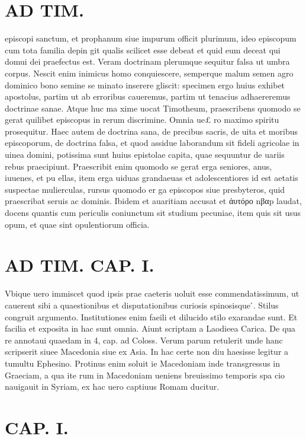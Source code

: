 \documentclass{article}
\begin{document}
\begin{pages}
\section*{AD TIM. }
\marginpar{[ p.93 ]}\pstart episcopi sanctum, et prophanum siue impurum officit plurimum, ideo episcopum cum tota familia depin git qualis scilicet esse debeat et quid eum deceat qui domui dei praefectus est.  \pend\pstart Veram doctrinam plerumque sequitur falsa ut umbra corpus. Nescit enim inimicus homo conquiescere, semperque malum semen agro dominico bono semine se minato inserere gliscit: specimen ergo huius exhibet apostolus, partim ut ab erroribus caueremus, partim ut tenacius adhaereremus doctrinae sanae. Atque huc ma xime uocat Timotheum, praescribens quomodo se gerat quilibet episcopus in rerum discrimine. Omnia ue£ ro maximo spiritu prosequitur.  \pend\pstart Haec autem de doctrina sana, de precibus sacris, de uita et moribus episcoporum, de doctrina falsa, et quod assidue laborandum sit fideli agricolae in uinea domini, potissima sunt huius epistolae capita, quae sequuntur de uariis rebus praecipiunt. Praescribit enim quomodo se gerat erga seniores, anus, iuuenes, et pu ellas, item erga uiduas grandaeuas et adolescentiores id est aetatis suspectae mulierculas, rursus quomodo er ga episcopos siue presbyteros, quid praescribat seruis ac dominis. Ibidem et auaritiam accusat et ἀυτόρο nβαp laudat, docens quantis cum periculis coniunctum sit studium pecuniae, item quis sit usus opum, et quae sint opulentiorum officia.  \pend
\section*{AD TIM. CAP. I. }
\marginpar{[ p.94 ]}\pstart Vbique uero immiscet quod ipsis prae caeteris uoluit esse commendatissimum, ut cauerent sibi a quaestionibus et disputationibus curiosis spinosisque ́.  \pend\pstart Stilus congruit argumento. Institutiones enim faeili et dilucido stilo exarandae sunt. Et facilia et exposita in hac sunt omnia. Aiunt scriptam a Laodieea Carica. De qua re annotaui quaedam in 4, cap. ad Coloss. Verum parum retulerit unde hanc scripserit siuee Macedonia siue ex Asia. In hac certe non diu haesisse legitur a tumultu Ephesino. Protinus enim soluit ie Macedoniam inde transgressus in Graeciam, a qua ite rum in Macedoniam ueniens breuissimo temporis spa cio nauigauit in Syriam, ex hac uero captiuus Romam ducitur.  \pend
\section{CAP. I.}
{}

\end{pages}
\end{document}

